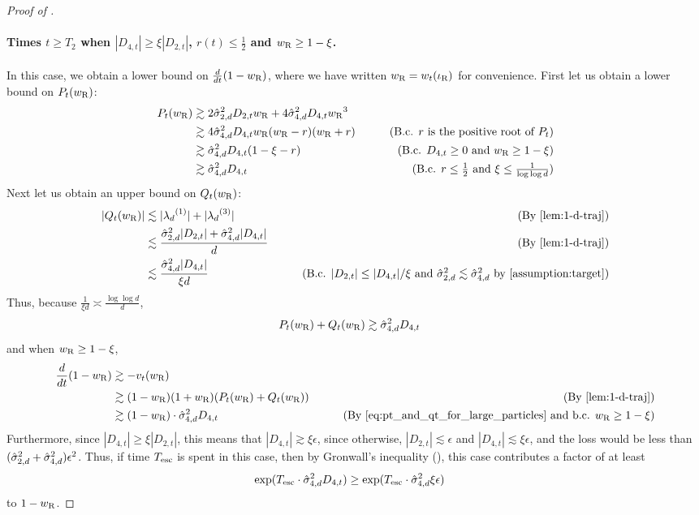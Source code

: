 \begin{proof}[Proof of ]
\paragraph{Times $t \geq T_2$ when $|D_{4, t}| \geq \xi |D_{2, t}|$, $r(t) \leq \frac{1}{2}$ and ${w_{\textup{R}}} \geq 1 - \xi$.} In this case, we obtain a lower bound on $\frac{d}{dt}(1 - {w_{\textup{R}}})$, where we have written ${w_{\textup{R}}} = w_t(\iota_{\textup{R}})$ for convenience. First let us obtain a lower bound on $P_t({w_{\textup{R}}})$:
\begin{align}
P_t(\wR)
& \gtrsim 2 \sigmaCoeffTwo^2 D_{2, t} \wR + 4 \sigmaCoeffFour^2 D_{4, t} \wR^3 \\ 
& \gtrsim 4 \sigmaCoeffFour^2 D_{4, t} \wR (\wR - r) (\wR + r)
& \tag{B.c. $r$ is the positive root of $P_t$} \\
& \gtrsim \sigmaCoeffFour^2 D_{4, t} (1 - \xi - r)
& \tag{B.c. $D_{4, t} \geq 0$ and $\wR \geq 1 - \xi$} \\
& \gtrsim \sigmaCoeffFour^2 D_{4, t} 
& \tag{B.c. $r \leq \frac{1}{2}$ and $\xi \leq \frac{1}{\log \log d}$}
\end{align}
Next let us obtain an upper bound on $Q_t({w_{\textup{R}}})$:
\begin{align}
|Q_t(\wR)|
& \lesssim |\lambdaD^{(1)}| + |\lambdaD^{(3)}|
& \tag{By \Cref{lem:1-d-traj}} \\
& \lesssim \frac{\sigmaCoeffTwo^2 |D_{2, t}| + \sigmaCoeffFour^2 |D_{4, t}|}{d}
& \tag{By \Cref{lem:1-d-traj}} \\
& \lesssim \frac{\sigmaCoeffFour^2 |D_{4, t}|}{\xi d}
& \tag{B.c. $|D_{2, t}| \leq |D_{4, t}|/\xi$ and $\sigmaCoeffTwo^2 \lesssim \sigmaCoeffFour^2$ by \Cref{assumption:target}}
\end{align}
Thus, because $\frac{1}{\xi d} \asymp \frac{\log \log d}{d}$,
\begin{align} \label{eq:pt_and_qt_for_large_particles}
P_t({w_{\textup{R}}}) + Q_t({w_{\textup{R}}})
& \gtrsim \hat{\sigma}_{4, d}^2 D_{4, t}
\end{align}
and when ${w_{\textup{R}}} \geq 1 - \xi$,
\begin{align}
\frac{d}{dt} (1 - \wR)
& \gtrsim -\vel_t(\wR) \\
& \gtrsim (1 - \wR) (1 + \wR) (P_t(\wR) + Q_t(\wR))
& \tag{By \Cref{lem:1-d-traj}} \\
& \gtrsim (1 - \wR) \cdot \sigmaCoeffFour^2 D_{4, t}
& \tag{By \Cref{eq:pt_and_qt_for_large_particles} and b.c. $\wR \geq 1 - \xi$}
\end{align}
Furthermore, since $|D_{4, t}| \geq \xi |D_{2, t}|$, this means that $|D_{4, t}| \gtrsim \xi \epsilon$, since otherwise, $|D_{2, t}| \lesssim \epsilon$ and $|D_{4, t}| \lesssim \xi \epsilon$, and the loss would be less than $(\hat{\sigma}_{2, d}^2 + \hat{\sigma}_{4, d}^2) \epsilon^2$. Thus, if time ${T_{\textup{esc}}}$ is spent in this case, then by Gronwall's inequality (), this case contributes a factor of at least 
\begin{align} \label{eq:root_small_contribution}
\exp({T_{\textup{esc}}} \cdot \hat{\sigma}_{4, d}^2 D_{4, t})
& \geq \exp({T_{\textup{esc}}} \cdot \hat{\sigma}_{4, d}^2 \xi \epsilon)
\end{align}
to $1 - {w_{\textup{R}}}$.


\end{proof}
